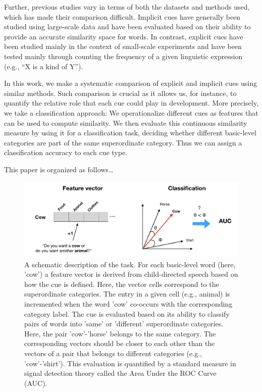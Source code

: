 \documentclass[10pt, letterpaper]{article}
\newenvironment{CodeChunk}{}{}
\begin{document}
Further, previous studies vary in terms of both the datasets and methods
used, which has made their comparison difficult. Implicit cues have
generally been studied using large-scale data and have been evaluated
based on their ability to provide an accurate similarity space for
words. In contrast, explicit cues have been studied mainly in the
context of small-scale experiments and have been tested mainly through
counting the frequency of a given linguistic expression (e.g., ``X is a
kind of Y'').

In this work, we make a systematic comparison of explicit and implicit
cues using similar methods. Such comparison is crucial as it allows us,
for instance, to quantify the relative role that each cue could play in
development. More precisely, we take a classification approach: We
operationalize different cues as features that can be used to compute
similarity. We then evaluate this continuous similarity measure by using
it for a classification task, deciding whether different basic-level
categories are part of the same superordinate category. Thus we can
assign a classification accuracy to each cue type.

This paper is organized as follows\ldots{}

\begin{CodeChunk}
\begin{figure}[h]

{\centering \includegraphics{cogsci_files/figure-latex/task-1} 

}

\caption{\label{fig:task} A schematic description of the task. For each basic-level word (here, 'cow') a feature vector is derived from child-directed speech based on how the cue is defined. Here, the vector cells correspond to the superordinate categories. The entry in a given cell (e.g., animal) is incremented when the word 'cow' co-occurs with the corresponding category label. The cue is evaluated based on its ability to classify pairs of words into 'same' or 'different' superordinate categories. Here, the pair 'cow'-'horse' belongs to the same category. The corresponding vectors should be closer to each other than the vectors of a pair that belongs to different categories (e.g., 'cow'-'shirt'). This evaluation is quantified by a standard measure in signal detection theory called the Area Under the ROC Curve (AUC).}\label{fig:task}
\end{figure}
\end{CodeChunk}
\end{document}
